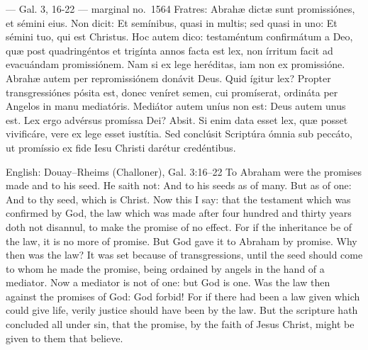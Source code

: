 \begin{appointedlatin}{ --- Gal. 3, 16-22 --- marginal no.\ 1564}
Fratres: Abrahæ dictæ sunt promissiónes, et sémini eius. Non dicit: Et
semínibus, quasi in multis; sed quasi in uno: Et sémini tuo, qui est Christus.
Hoc autem dico: testaméntum confirmátum a Deo, quæ post quadringéntos et
trigínta annos facta est lex, non írritum facit ad evacuándam promissiónem.
Nam si ex lege heréditas, iam non ex promissióne. Abrahæ autem per
repromissiónem donávit Deus. Quid ígitur lex? Propter transgressiónes pósita
est, donec veníret semen, cui promíserat, ordináta per Angelos in manu
mediatóris. Mediátor autem uníus non est: Deus autem unus est. Lex ergo
advérsus promíssa Dei? Absit. Si enim data esset lex, quæ posset vivificáre,
vere ex lege esset iustítia. Sed conclúsit Scriptúra ómnia sub peccáto, ut
promíssio ex fide Iesu Christi darétur credéntibus.
\end{appointedlatin}

\begin{namedtranslation}{English: Douay--Rheims (Challoner), Gal. 3:16--22}
To Abraham were the promises made and to his seed. He saith not: And to his
seeds as of many. But as of one: And to thy seed, which is Christ. Now this I
say: that the testament which was confirmed by God, the law which was made
after four hundred and thirty years doth not disannul, to make the promise of
no effect. For if the inheritance be of the law, it is no more of promise.
But God gave it to Abraham by promise. Why then was the law? It was set
because of transgressions, until the seed should come to whom he made the
promise, being ordained by angels in the hand of a mediator. Now a mediator is
not of one: but God is one. Was the law then against the promises of God: God
forbid! For if there had been a law given which could give life, verily
justice should have been by the law. But the scripture hath concluded all
under sin, that the promise, by the faith of Jesus Christ, might be given to
them that believe.
\end{namedtranslation}


